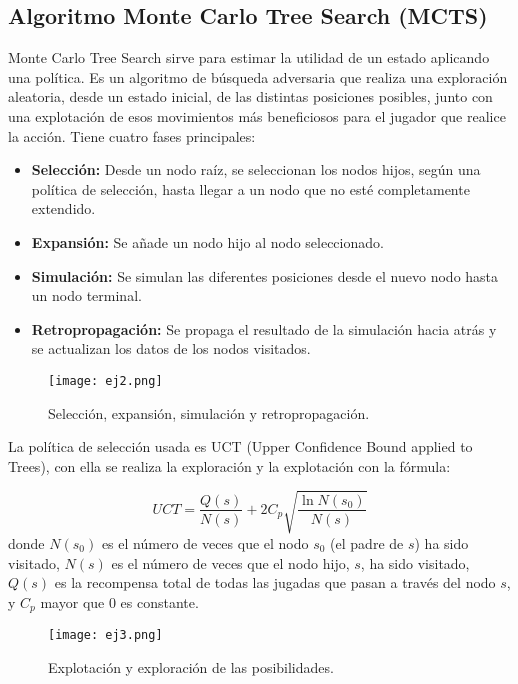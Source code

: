 \documentclass[conference]{IEEEtran}
\begin{document}
\subsection{Algoritmo Monte Carlo Tree Search (MCTS)}
Monte Carlo Tree Search sirve para estimar la utilidad de un estado aplicando una política. Es un algoritmo de búsqueda adversaria que realiza una exploración aleatoria, desde un estado inicial, de las distintas posiciones posibles, junto con una explotación de esos movimientos más beneficiosos para el jugador que realice la acción. Tiene cuatro fases principales:

\begin{itemize}
    \item \textbf{Selección:} Desde un nodo raíz, se seleccionan los nodos hijos, según una política de selección, hasta llegar a un nodo que no esté completamente extendido.
    \item \textbf{Expansión:} Se añade un nodo hijo al nodo seleccionado.
    \item \textbf{Simulación:} Se simulan las diferentes posiciones desde el nuevo nodo hasta un nodo terminal.
    \item \textbf{Retropropagación:} Se propaga el resultado de la simulación hacia atrás y se actualizan los datos de los nodos visitados.
\end{itemize}

\begin{figure}[htbp]
    \centerline{\texttt{[image: ej2.png]}}
    \caption{Selección, expansión, simulación y retropropagación.}
    \label{figura}
\end{figure}

La política de selección usada es UCT (Upper Confidence Bound applied to Trees), con ella se realiza la exploración y la explotación con la fórmula:

\[
UCT = \frac{Q(s)}{N(s)} + 2C_p \sqrt{\frac{\ln N(s_0)}{N(s)}}
\]
donde $N(s_0)$ es el número de veces que el nodo $s_0$ (el padre de $s$) ha sido visitado, $N(s)$ es el número de veces que el nodo hijo, $s$, ha sido visitado, $Q(s)$ es la recompensa total de todas las jugadas que pasan a través del nodo $s$, y $C_p$ mayor que 0 es constante.

\begin{figure}[htbp]
    \centerline{\texttt{[image: ej3.png]}}
    \caption{Explotación y exploración de las posibilidades.}
    \label{figura}
\end{figure}
\end{document}
